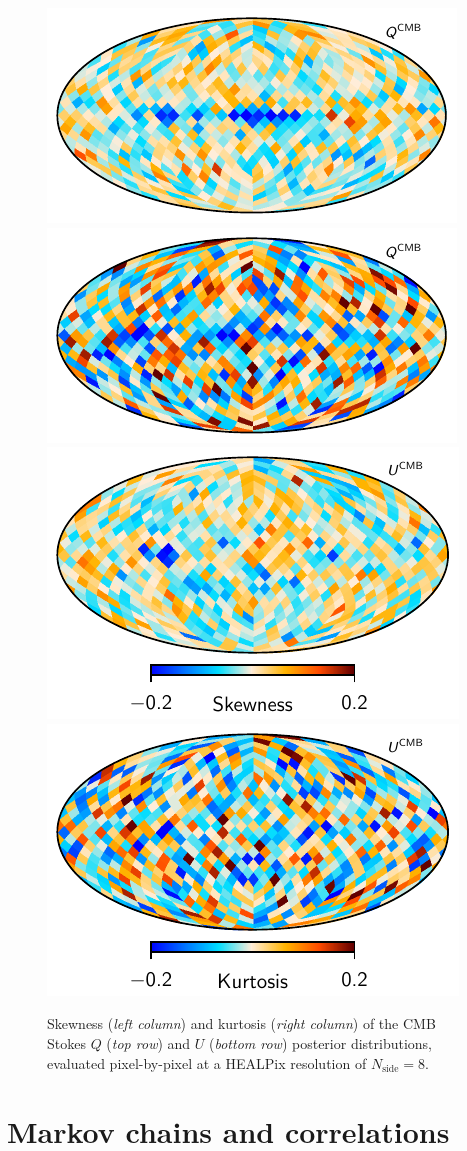 \documentclass[twocolumn]{aa}
\begin{document}
\begin{figure}
  \includegraphics[width=0.49\linewidth]{figs/skewness_CMB_Q.pdf}
  \includegraphics[width=0.49\linewidth]{figs/kurtosis_CMB_Q.pdf}\\
  \includegraphics[width=0.49\linewidth]{figs/skewness_CMB_U.pdf}
  \includegraphics[width=0.49\linewidth]{figs/kurtosis_CMB_U.pdf}
  \caption{Skewness (\emph{left column}) and kurtosis (\emph{right
      column}) of the CMB Stokes $Q$ (\emph{top row}) and $U$
    (\emph{bottom row}) posterior distributions, evaluated
    pixel-by-pixel at a HEALPix resolution of $N_{\mathrm{side}}=8$.}
  \label{fig:nongauss}  
\end{figure}


\section{Markov chains and correlations}
\label{sec:degeneracies}
\end{document}
